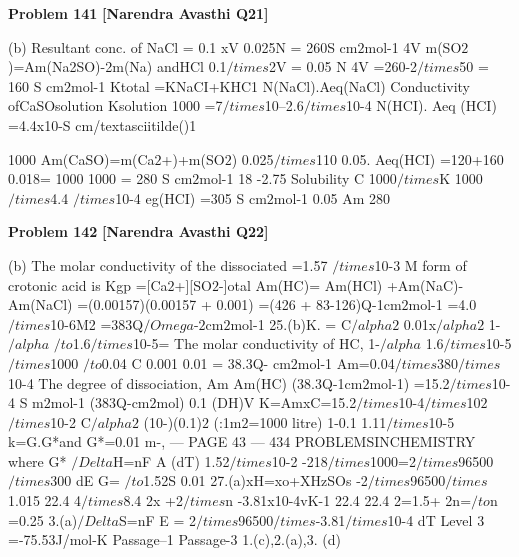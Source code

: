\begin{problembox}
\textbf{Problem 141} \hfill \textbf{[Narendra Avasthi Q21]}
\label{q:ext-narendra_avasthi_all_questions-141}

(b) Resultant conc. of NaCl =
0.1 xV
0.025N
= 260S cm$2$mol-1
4V
m(SO$2$)=Am(Na2SO)-2m(Na)
andHCl
0.1$/times$2V
= 0.05 N
4V
=260-2$/times$50
= 160 S cm$2$mol-1
Ktotal =KNaCI+KHC1
N(NaCl).Aeq(NaCl)
Conductivity ofCaSOsolution
Ksolution
1000
=7$/times$10--2.6$/times$10-4
N(HCI). Aeq (HCI)
=4.4x10-S cm/textasciitilde()1
 
1000
Am(CaSO)=m(Ca$2$+)+m(SO$2$)
0.025$/times$110
0.05. Aeq(HCI)
=120+160
0.018=
1000
1000
= 280 S cm$2$mol-1
18 -2.75
Solubility C
1000$/times$K
1000 $/times$4.4 $/times$10-4
eg(HCI)
=305 S cm$2$mol-1
0.05
Am
280
\end{problembox}

\begin{problembox}
\textbf{Problem 142} \hfill \textbf{[Narendra Avasthi Q22]}
\label{q:ext-narendra_avasthi_all_questions-142}

(b) The molar conductivity of the dissociated
=1.57 $/times$10-3 M
form of crotonic acid is
Kgp =[Ca$2$+][SO$2$-]otal
Am(HC)= Am(HCl) +Am(NaC)-Am(NaCl)
=(0.00157)(0.00157 + 0.001)
=(426 + 83-126)Q-1cm$2$mol-1
=4.0$/times$10-6M2
=383Q$/Omega$-$2$cm$2$mol-1
25.(b)K. =
C$/alpha$$2$
0.01x$/alpha$$2$
1-$/alpha$
$/to$1.6$/times$10-5=
The molar conductivity of HC,
1-$/alpha$
1.6$/times$10-5
$/times$1000
$/to$0.04
C
0.001
0.01
= 38.3Q- cm$2$mol-1
Am=0.04$/times$380$/times$10-4
The degree of dissociation,
Am
Am(HC)
(38.3Q-1cm$2$mol-1)
=15.2$/times$10-4 S m$2$mol-1
(383Q-cm$2$mol)
0.1
(DH)V
K=AmxC=15.2$/times$10-4$/times$10$2$$/times$10-2
C$/alpha$$2$
(10-)(0.1)$2$
(:1m$2$=1000 litre)
1-0.1
1.11$/times$10-5
k=G.G*and G*=0.01 m-,
--- PAGE 43 ---
434
PROBLEMSINCHEMISTRY
where G*
$/Delta$H=nF
A
(dT)
1.52$/times$10-2
-218$/times$1000=2$/times$96500$/times$300
dE
G=
$/to$1.52S
0.01
27.(a)xH=xo+XHzSOs
-2$/times$96500$/times$1.015
22.4
\underline{\hspace{1cm}}4$/times$8.4
2x
+2$/times$n
-3.81x10-4vK-1
22.4
22.4
2=1.5+ 2n=$/to$n =0.25
3.(a)$/Delta$S=nF
E
= 2$/times$96500$/times$-3.81$/times$10-4
dT
Level 3
=-75.53J/mol-K
Passage--1
Passage-3
1.(c),2.(a),3. (d)
\end{problembox}

